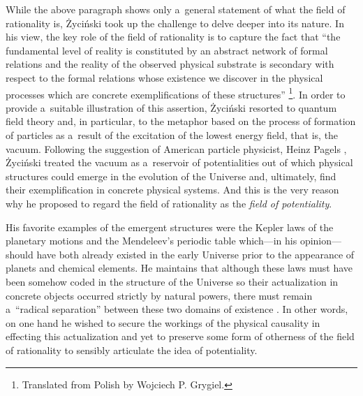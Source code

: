 While the above paragraph shows only a~general statement of what the field of rationality is, Życiński took up the challenge to delve deeper into its nature. In his view, the key role of the field of rationality is to capture the fact that ``the fundamental level of reality is constituted by an abstract network of formal relations and the reality of the observed physical substrate is secondary with respect to the formal relations whose existence we discover in the physical processes which are concrete exemplifications of these structures'' 
\parencite[][p.102]{zycinski_status_1995}%
\footnote{Translated from Polish by Wojciech P. Grygiel.}. In order to provide a~suitable illustration of this assertion, Życiński resorted to quantum field theory and, in particular, to the metaphor based on the process of formation of particles as a~result of the excitation of the lowest energy field, that is, the vacuum. Following the suggestion of American particle physicist, Heinz Pagels 
\parencite*[][p.245]{pagels_cosmic_1983}, %
 Życiński treated the vacuum as a~reservoir of potentialities out of which physical structures could emerge in the evolution of the Universe and, ultimately, find their exemplification in concrete physical systems. And this is the very reason why he proposed to regard the field of rationality as the \textit{field of potentiality}.



His favorite examples of the emergent structures were the Kepler laws of the planetary motions and the Mendeleev's periodic table which---in his opinion---should have both already existed in the early Universe prior to the appearance of planets and chemical elements. He maintains that although these laws must have been somehow coded in the structure of the Universe so their actualization in concrete objects occurred strictly by natural powers, there must remain a~``radical separation'' between these two domains of existence 
\parencite[][pp.53–54]{zycinski_pole_2006}. %
 In other words, on one hand he wished to secure the workings of the physical causality in effecting this actualization and yet to preserve some form of otherness of the field of rationality to sensibly articulate the idea of potentiality.



